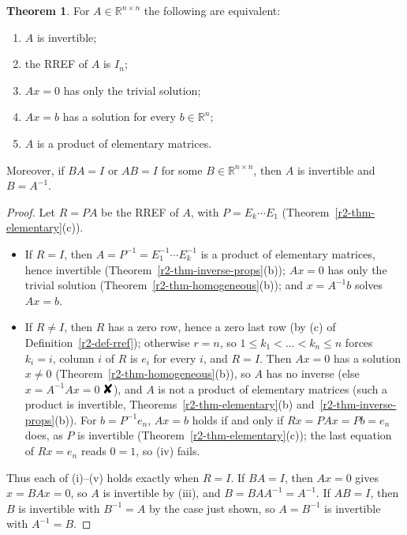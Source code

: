 \documentclass[12pt]{article}
\newcommand{\R}{\mathbb R}
\newcommand{\contradiction}{\mathord{\text{\large\ding{56}}}}
\theoremstyle{definition}
\newtheorem{theorem}{Theorem}
\begin{document}
\begin{theorem}\label{r2-thm-invertible}
For \(A\in\R^{n\times n}\) the following are equivalent:
\begin{enumerate}[label=(\roman*)]
\item \(A\) is invertible;
\item the RREF of \(A\) is \(I_n\);
\item \(Ax=0\) has only the trivial solution;
\item \(Ax=b\) has a solution for every \(b\in\R^n\);
\item \(A\) is a product of elementary matrices.
\end{enumerate}
Moreover, if \(BA=I\) or \(AB=I\) for some \(B\in\R^{n\times n}\), then \(A\) is invertible
and \(B=A^{-1}\).
\end{theorem}
\begin{proof}
Let \(R=PA\) be the RREF of \(A\), with \(P=E_k\cdots E_1\) (Theorem~\ref{r2-thm-elementary}(c)).
\begin{itemize}
\item If \(R=I\), then \(A=P^{-1}=E_1^{-1}\cdots E_k^{-1}\) is a product of elementary
matrices, hence invertible (Theorem~\ref{r2-thm-inverse-props}(b)); \(Ax=0\) has only the trivial
solution (Theorem~\ref{r2-thm-homogeneous}(b)); and \(x=A^{-1}b\) solves \(Ax=b\).
\item If \(R\ne I\), then \(R\) has a zero row, hence a zero last row (by (c) of
Definition~\ref{r2-def-rref}); otherwise \(r=n\), so \(1\leqslant k_1<\dots<k_n\leqslant n\) forces \(k_i=i\),
column \(i\) of \(R\) is \(e_i\) for every \(i\), and \(R=I\). Then \(Ax=0\) has a solution \(x\ne0\)
(Theorem~\ref{r2-thm-homogeneous}(b)), so \(A\) has no inverse (else \(x=A^{-1}Ax=0\)
\(\contradiction\)), and \(A\) is not a product of elementary matrices (such a product is
invertible, Theorems~\ref{r2-thm-elementary}(b) and~\ref{r2-thm-inverse-props}(b)). For
\(b=P^{-1}e_n\), \(Ax=b\) holds if and only if \(Rx=PAx=Pb=e_n\) does, as \(P\) is invertible
(Theorem~\ref{r2-thm-elementary}(c)); the last equation of \(Rx=e_n\) reads \(0=1\), so (iv) fails.
\end{itemize}
Thus each of (i)--(v) holds exactly when \(R=I\). If \(BA=I\), then \(Ax=0\) gives
\(x=BAx=0\), so \(A\) is invertible by (iii), and \(B=BAA^{-1}=A^{-1}\). If \(AB=I\), then
\(B\) is invertible with \(B^{-1}=A\) by the case just shown, so \(A=B^{-1}\) is invertible
with \(A^{-1}=B\).
\end{proof}
\end{document}
